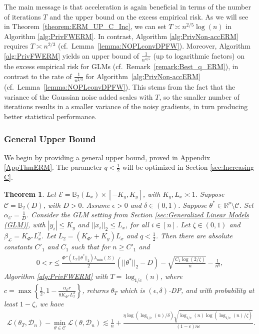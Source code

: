 \documentclass{article}
\newtheorem{theorem}{Theorem}
\begin{document}
The main message is that acceleration is again beneficial in terms of the number of iterations $T$ and the upper bound on the excess empirical risk. As we will see in Theorem~\ref{theorem:ERM_UP_C_Inc}, we can set $T \asymp n^{2/5}\log(n)$ in Algorithm \ref{alg:PrivFWERM}. In contrast, Algorithm \ref{alg:PrivNon-accERM} requires $T \asymp n^{2/3}$ (cf.\ Lemma~\ref{lemma:NOPLconvDPFW}). Moreover, Algorithm \ref{alg:PrivFWERM} yields an upper bound of $\frac{1}{n^{4/5}}$ (up to logarithmic factors) on the excess empirical risk for GLMs (cf.\ Remark~\ref{remark:Best_q_ERM}), in contrast to the rate of $\frac{1}{n^{2/3}}$ for Algorithm~\ref{alg:PrivNon-accERM} (cf.\ Lemma~\ref{lemma:NOPLconvDPFW}). This stems from the fact that the variance of the Gaussian noise added scales with $T$, so the smaller number of iterations results in a smaller variance of the noisy gradients, in turn producing better statistical performance.


\subsubsection{General Upper Bound}

We begin by providing a general upper bound, proved in Appendix \ref{AppThmERM}. The parameter $q < \frac{1}{2}$ will be optimized in Section \ref{sec:Increasing C}.

\begin{theorem}
\label{theorem:ERM_GLM_UP_General}
Let $\mathcal{E} = \mathbb{B}_2(L_x)\times [-K_y, K_y]$, with $K_y, L_x \asymp 1$. Suppose $\mathcal{C} = \mathbb{B}_{2}\left(D\right)$, with $D > 0$. Assume $\epsilon > 0$ and $\delta \in (0, 1)$. Suppose $\theta^* \in \mathbb{R}^p \setminus \mathcal{C}$. Set $\alpha_{\mathcal{C}} = \frac{1}{D}$. Consider the GLM setting from Section \ref{sec:Generalized Linear Models (GLM)}, with $|y_i| \leq K_y$ and $||x_i||_2 \leq L_x$, for all $i \in [n]$. Let $\zeta \in (0, 1)$ and $\beta_{\mathcal{L}} = K_{\Phi''}L_x^2$. Let $L_2 = (K_{\Phi'} + K_y)L_x$ and $q < \frac{1}{2}$. Then there are absolute constants $C'_1$ and $C_1$ such that for $n \geq C'_1$ and
\begin{align*}
0 < r \leq \frac{\Phi''(L_x||\theta^*||_2)\lambda_{\min}(\Sigma)}{2}(||\theta^*||_2 - D) - \sqrt{\frac{C_1\log(2/\zeta)}{n}} - \frac{1}{n^q},
\end{align*}
Algorithm \ref{alg:PrivFWERM} with $T = \log_{1/c}(n)$, where $c = \max\left\{\frac{1}{2}, 1 - \frac{\alpha_{\mathcal{C}}r}{8K_{\Phi''}L_x^2}\right\}$, returns $\theta_T$ which is $(\epsilon, \delta)$-DP, and with probability at least $1 - \zeta$, we have
\begin{align*}
\mathcal{L}(\theta_T, \mathcal{D}_n) - \mathop{\min}\limits_{\theta \in \mathcal{C}}\mathcal{L}(\theta, \mathcal{D}_n) \lesssim \frac{1}{n} + \frac{\eta\log\left(\log_{1/c}(n)/\delta\right)\sqrt{\log_{1/c}(n)\log\left(\log_{1/c}(n)/\zeta\right)}}{(1 - c)n\epsilon}.
\end{align*} 
\end{theorem}
\end{document}
